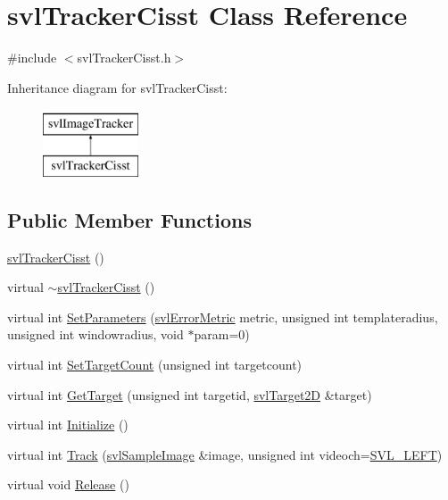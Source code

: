 \hypertarget{classsvl_tracker_cisst}{}\section{svl\+Tracker\+Cisst Class Reference}
\label{classsvl_tracker_cisst}


{\ttfamily \#include $<$svl\+Tracker\+Cisst.\+h$>$}

Inheritance diagram for svl\+Tracker\+Cisst\+:\begin{figure}[H]
\begin{center}
\leavevmode
\includegraphics[height=2.000000cm]{d3/dee/classsvl_tracker_cisst}
\end{center}
\end{figure}
\subsection*{Public Member Functions}
\begin{DoxyCompactItemize}
\item 
\hyperlink{classsvl_tracker_cisst_ac28b4b10868b2958341d5ff76ce4faed}{svl\+Tracker\+Cisst} ()
\item 
virtual \hyperlink{classsvl_tracker_cisst_a3e03032a2c7f67bba38f9ae2bdb8a55a}{$\sim$svl\+Tracker\+Cisst} ()
\item 
virtual int \hyperlink{classsvl_tracker_cisst_a9834ebab345e4e85802800b7da13857e}{Set\+Parameters} (\hyperlink{svl_definitions_8h_ade0b97ec3319ac710d7478dd2b608727}{svl\+Error\+Metric} metric, unsigned int templateradius, unsigned int windowradius, void $\ast$param=0)
\item 
virtual int \hyperlink{classsvl_tracker_cisst_aa9ece9d86e6288e2878cc4d9a5aa2ecc}{Set\+Target\+Count} (unsigned int targetcount)
\item 
virtual int \hyperlink{classsvl_tracker_cisst_ac705a780f73a3493f8b294757365fe94}{Get\+Target} (unsigned int targetid, \hyperlink{structsvl_target2_d}{svl\+Target2\+D} \&target)
\item 
virtual int \hyperlink{classsvl_tracker_cisst_a2c5e0e63fb75a4b05a1b0114d3871703}{Initialize} ()
\item 
virtual int \hyperlink{classsvl_tracker_cisst_a45b609e4a8b49d3d3dcfee9520af4997}{Track} (\hyperlink{classsvl_sample_image}{svl\+Sample\+Image} \&image, unsigned int videoch=\hyperlink{svl_definitions_8h_ab9fec7615f19c8df2919eebcab0b187f}{S\+V\+L\+\_\+\+L\+E\+F\+T})
\item 
virtual void \hyperlink{classsvl_tracker_cisst_ac7c0f1b27c219e01880016fe8a547d74}{Release} ()
\end{DoxyCompactItemize}
